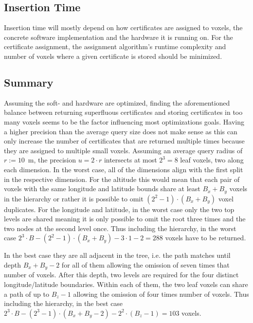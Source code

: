 \documentclass[10pt,conference,compsocconf]{IEEEtran}
\begin{document}
\subsection{Insertion Time}
Insertion time will mostly depend on how certificates are assigned to voxels, the concrete software implementation and the hardware it is running on.
For the certificate assignment, the assignment algorithm's runtime complexity and number of voxels where a given certificate is stored should be minimized.

\subsection{Summary}
Assuming the soft- and hardware are optimized, finding the aforementioned balance between returning superfluous certificates and storing certificates in too many voxels seems to be the factor influencing most optimizations goals.
Having a higher precision than the average query size does not make sense as this can only increase the number of certificates that are returned multiple times because they are assigned to multiple small voxels.
Assuming an average query radius of $r := 10$~m, the precision $u = 2 \cdot r$ intersects at most $2^3 = 8$ leaf voxels, two along each dimension.
In the worst case, all of the dimensions align with the first split in the respective dimension.
For the altitude this would mean that each pair of voxels with the same longitude and latitude bounds share at least $B_x + B_y$ voxels in the hierarchy or rather it is possible to omit $(2^2 - 1) \cdot (B_x + B_y)$ voxel duplicates.
For the longitude and latitude, in the worst case only the two top levels are shared meaning it is only possible to omit the root three times and the two nodes at the second level once.
Thus including the hierarchy, in the worst case $2^3 \cdot B - (2^2 - 1) \cdot (B_x + B_y) - 3 \cdot 1 - 2 = 288$ voxels have to be returned.

In the best case they are all adjacent in the tree, i.e. the path matches until depth $B_x + B_y - 2$ for all of them allowing the omission of seven times that number of voxels.
After this depth, two levels are required for the four distinct longitude/latitude boundaries.
Within each of them, the two leaf voxels can share a path of up to $B_z - 1$ allowing the omission of four times number of voxels.
Thus including the hierarchy, in the best case $2^3 \cdot B - (2^3 - 1) \cdot (B_x + B_y - 2) - 2^2 \cdot (B_z - 1) = 103$ voxels.

\end{document}
